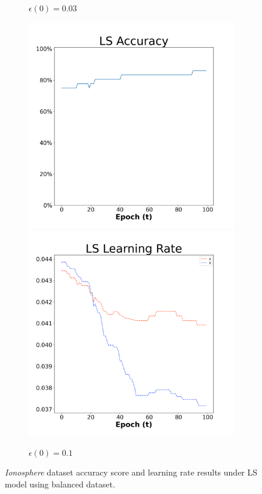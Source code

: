 \begin{figure}[H]
\begin{subfigure}{0.3\textwidth}
  \caption{$\epsilon(0)=0.03$}
\end{subfigure}\hfil %
\begin{subfigure}{0.3\textwidth}
  \includegraphics[width=\linewidth]{images/exper1/Ionosphere/LS_0.1_acc.png}
  \includegraphics[width=\linewidth]{images/exper1/Ionosphere/LS_0.1_lr.png}
  \caption{$\epsilon(0)=0.1$}
\end{subfigure}

\caption{\textit{Ionosphere} dataset accuracy score and learning rate results under LS model using balanced dataset.}
\end{figure}

